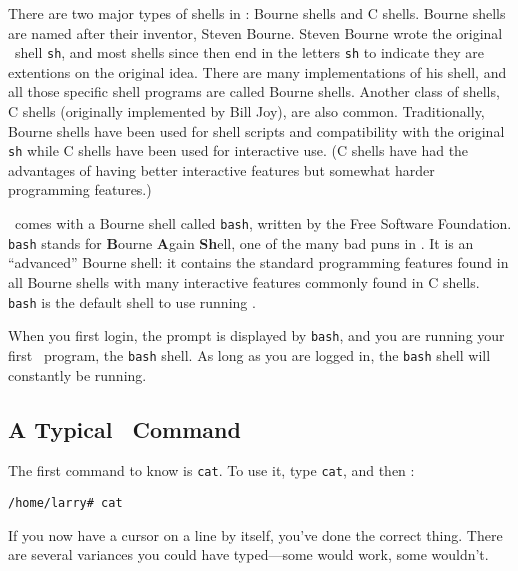 There are two major types of shells in \unix: Bourne shells and C
shells.  Bourne shells are named after their inventor, Steven
Bourne. Steven Bourne wrote the original
\unix\ shell {\tt sh}, and most shells since then end in
the letters {\tt sh} to indicate they are extentions on the original
idea.  There are many implementations of his shell, and all those
specific shell programs are called Bourne shells. Another class of
shells, C shells (originally implemented by Bill Joy), are also common. Traditionally, Bourne shells have been used
for shell scripts and compatibility with the original {\tt sh} while C
shells have been used for interactive use.  (C shells have had the
advantages of having better interactive features but somewhat harder
programming features.)

\linux\ comes with a Bourne shell called {\tt bash},
written by the Free Software Foundation. 
{\tt bash} stands for {\bf B}ourne {\bf A}gain {\bf Sh}ell, one of the
many bad puns in \unix.  It is an ``advanced'' Bourne shell:  it
contains the standard programming features found in all Bourne shells
with many interactive features commonly found in C shells.  {\tt bash}
is the default shell to use running \linux.

When you first login, the prompt is displayed by {\tt bash}, and you
are running your first \unix\ program, the {\tt bash} shell.  As long
as you are logged in, the {\tt bash} shell will constantly be running.

\subsection{A Typical \unix\ Command}

The first command to know is {\tt cat}.  To use it,
type {\tt cat}, and then \ret:

\begin{screen}\begin{verbatim}
/home/larry# cat

\end{verbatim}\end{screen}

If you now have a cursor on a line by itself, you've done the correct
thing.  There are several variances you could have typed---some would
work, some wouldn't.

